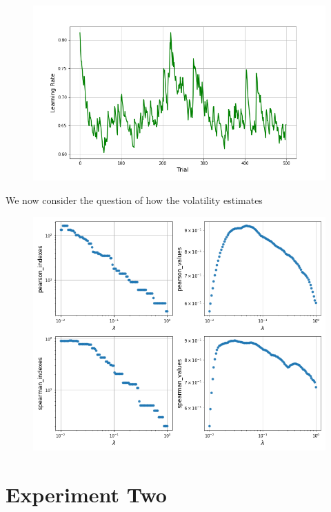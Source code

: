 \documentclass[12pt]{article}
\theoremstyle{definition}
\begin{document}
\begin{figure}[H]
    \centering
    \includegraphics[scale=0.6]{../Figures/exp1_lr.png}
\end{figure}

We now consider the question of how the volatility estimates 


\begin{figure}[H]
    \centering
    \includegraphics[scale=0.6]{../Figures/exp1_cors.png}
\end{figure}
     

\newpage 
\section*{Experiment Two}
\end{document}
